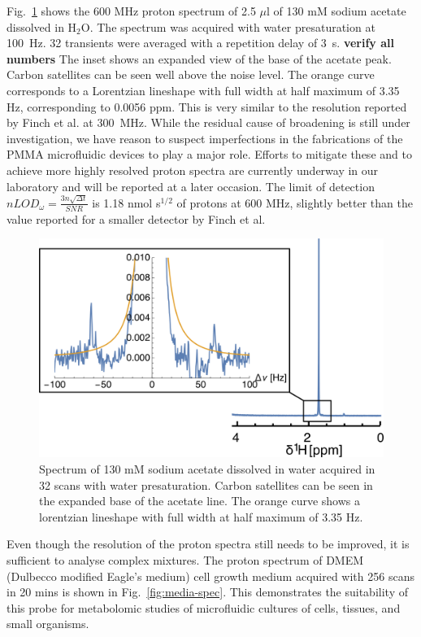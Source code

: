 \documentclass[preprint,5p]{elsarticle}
\newcommand{\todo}[1]{{\color{red}\textbf{#1}}}
\newcommand{\fig}[1]{Fig.~\ref{#1}}
\begin{document}
\fig{fig:lineshape} shows the 600 MHz proton spectrum of 2.5 $\mu$l of 130 mM  sodium acetate dissolved in H$_2$O. 
The spectrum was acquired with water presaturation at 100~Hz. 32 transients were averaged with a repetition delay
of 3~s. \todo{verify all numbers} 
The inset shows an expanded view of the base of the acetate peak. Carbon satellites can be seen well above 
the noise level. The orange curve corresponds to a Lorentzian lineshape with full width at half maximum of 
3.35 Hz, corresponding to 0.0056 ppm. This is very similar to the resolution reported by Finch et al. at 300~MHz.
While the residual cause of broadening is still under investigation, we have reason to suspect imperfections
in the fabrications of the PMMA microfluidic devices to play a major role. Efforts to mitigate these and to
achieve more highly resolved proton spectra are currently underway in our laboratory and will be reported at a later
occasion.  The limit of detection $nLOD_{\omega}=\frac{3n\sqrt{{\Delta}t}}{SNR}$ is 
1.18 nmol s$^{1/2}$ of protons at 600 MHz, slightly better than the value reported for a 
smaller detector by Finch et al.~\cite{gream_2016}

\begin{figure}
\centering
\includegraphics[width=.7\linewidth,keepaspectratio=true]{./figures/lineshape.png} 
\caption{Spectrum of 130 mM sodium acetate dissolved in water acquired in 32 scans with water presaturation. Carbon satellites can be seen in the expanded base of the acetate line. The orange curve shows a lorentzian lineshape with full width at half maximum of 3.35 Hz.}
\label{fig:lineshape} 
\end{figure}

Even though the resolution of the proton spectra still needs to be improved, it is sufficient to analyse
complex mixtures. The proton spectrum of DMEM (Dulbecco modified Eagle's medium) cell growth medium acquired with 256 
scans in 20 mins is shown in \fig{fig:media-spec}. This demonstrates the suitability of this probe 
for metabolomic studies of microfluidic cultures of cells, tissues, and small organisms. 
\end{document}
